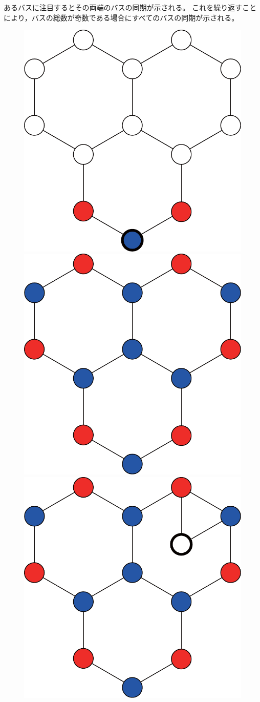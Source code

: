 \documentclass[tombow,dvipdfmx]{corona-a5-1.1}
\begin{document}
\begin{証明}
あるバスに注目するとその両端のバスの同期が示される。
これを繰り返すことにより，バスの総数が奇数である場合にすべてのバスの同期が示される。
\end{証明}

\begin{figure}[t]
  \centering
  {
  \begin{minipage}{0.3\linewidth}
    \centering
    \includegraphics[width = .60\linewidth]{figs/honya}
    \subcaption{  }
  \end{minipage}
  \begin{minipage}{0.3\linewidth}
    \centering
    \includegraphics[width = .60\linewidth]{figs/honyb}
    \subcaption{  }
  \end{minipage}
  \begin{minipage}{0.3\linewidth}
    \centering
    \includegraphics[width = .60\linewidth]{figs/honyc}

\end{minipage}}
\end{figure}
\end{document}
